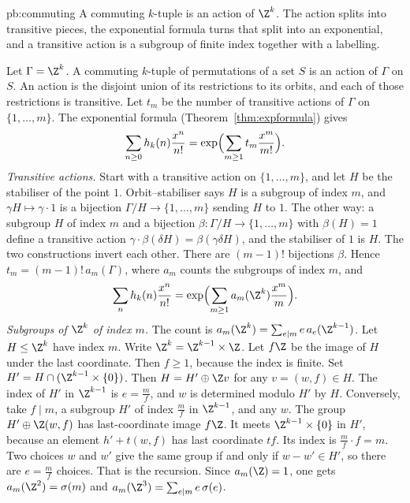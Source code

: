 \begin{solution}{pb:commuting}
\idea A commuting $k$-tuple is an action of $\Z^k$. The action splits into transitive pieces, the exponential formula turns that split into an exponential, and a transitive action is a subgroup of finite index together with a labelling.

\writeup Let $\Gamma=\Z^k$. A commuting $k$-tuple of permutations of a set $S$ is an action of $\Gamma$ on $S$. An action
is the disjoint union of its restrictions to its orbits, and each of those restrictions is transitive. Let $t_m$ be the number of transitive
actions of $\Gamma$ on $\{1,\dots,m\}$. The exponential formula (Theorem~\ref{thm:expformula}) gives
\[
\sum_{n\ge0}h_k(n)\frac{x^n}{n!}=\exp\Bigl(\sum_{m\ge1}t_m\frac{x^m}{m!}\Bigr).
\]
\emph{Transitive actions.} Start with a transitive action on $\{1,\dots,m\}$, and let $H$ be the stabiliser of the point $1$. Orbit--stabiliser says $H$ is a subgroup
of index $m$, and $\gamma H\mapsto\gamma\cdot1$ is a bijection $\Gamma/H\to\{1,\dots,m\}$ sending $H$ to $1$.
The other way: a subgroup $H$ of index $m$ and a bijection $\beta:\Gamma/H\to\{1,\dots,m\}$ with $\beta(H)=1$ define a transitive action
$\gamma\cdot\beta(\delta H)=\beta(\gamma\delta H)$, and the stabiliser of $1$ is $H$. The two constructions invert each other. There are
$(m-1)!$ bijections $\beta$. Hence $t_m=(m-1)!\,a_m(\Gamma)$, where $a_m$ counts the subgroups of index $m$, and
\[
\sum_nh_k(n)\frac{x^n}{n!}=\exp\Bigl(\sum_{m\ge1}a_m(\Z^k)\frac{x^m}m\Bigr).
\]
\emph{Subgroups of $\Z^k$ of index $m$.} The count is $a_m(\Z^k)=\sum_{e\mid m}e\,a_e(\Z^{k-1})$. Let $H\le\Z^k$ have index $m$. Write
$\Z^k=\Z^{k-1}\times\Z$. Let $f\Z$ be the image of $H$ under the last coordinate. Then $f\ge1$, because the index is finite. Set
$H'=H\cap(\Z^{k-1}\times\{0\})$. Then $H=H'\oplus\Z v$ for any $v=(w,f)\in H$. The index of $H'$ in $\Z^{k-1}$ is $e=\frac mf$, and $w$ is
determined modulo $H'$ by $H$. Conversely, take $f\mid m$, a subgroup $H'$ of index $\frac mf$ in $\Z^{k-1}$, and any $w$. The group
$H'\oplus\Z(w,f)$ has last-coordinate image $f\Z$. It meets $\Z^{k-1}\times\{0\}$ in $H'$, because an element $h'+t(w,f)$ has last coordinate
$tf$. Its index is $\frac mf\cdot f=m$. Two choices $w$ and $w'$ give the same group if and only if $w-w'\in H'$, so there are
$e=\frac mf$ choices. That is the recursion. Since $a_m(\Z)=1$, one gets $a_m(\Z^2)=\sigma(m)$ and $a_m(\Z^3)=\sum_{e\mid m}e\,\sigma(e)$.


\end{solution}
